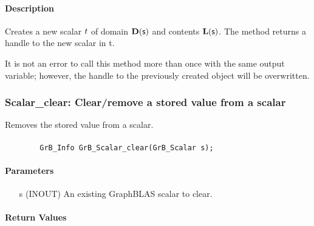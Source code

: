 \paragraph{Description}

Creates a new scalar ${t}$ of domain $\mathbf{D}({\sf s})$ and contents 
$\mathbf{L}({\sf s})$. The method returns a handle to the new scalar in {\sf t}.

It is not an error to call this method more than once with the same output variable;  
however, the handle to the previously created object will be overwritten. 


\subsubsection{{\sf Scalar\_clear}: Clear/remove a stored value from a scalar}

Removes the stored value from a scalar.

\paragraph{\syntax}

\begin{verbatim}
        GrB_Info GrB_Scalar_clear(GrB_Scalar s);
\end{verbatim}

\paragraph{Parameters}

\begin{itemize}[leftmargin=1.1in]
    \item[{\sf s}] ({\sf INOUT}) An existing GraphBLAS scalar to clear.
\end{itemize}

\paragraph{Return Values}

